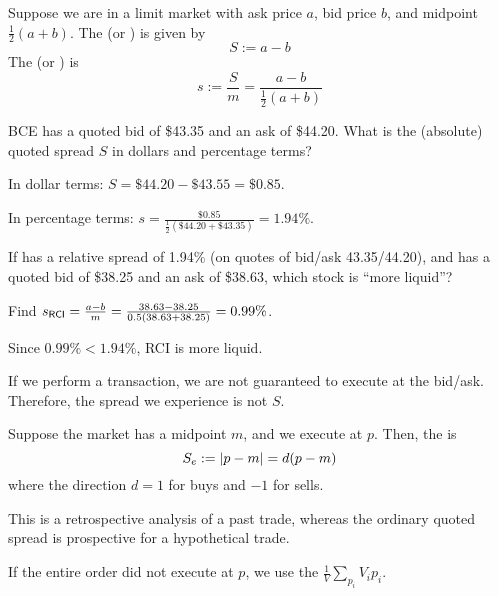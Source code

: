 \documentclass[class=bu430,notes,tikz]{agony}
\begin{document}
\begin{defn}
  Suppose we are in a limit market with ask price $a$, bid price $b$,
  and midpoint $\frac12(a+b)$.
  The  (or ) 
  is given by
  \[ S := a - b \]
  The  (or ) is
  \[ s := \frac{S}{m} = \frac{a-b}{\frac12(a+b)} \]
\end{defn}

\begin{example}
  BCE has a quoted bid of \$43.35 and an ask of \$44.20.
  What is the (absolute) quoted spread $S$ in dollars and percentage terms?
\end{example}
\begin{sol}
  In dollar terms: $S = \$44.20 - \$43.55 = \$0.85$.

    In percentage terms: $s = \frac{\$0.85}{\frac12(\$44.20+\$43.35)} = 1.94\%$.
\end{sol}

\begin{example}
  If  has a relative spread of 1.94\% (on quotes of bid/ask 43.35/44.20),
  and  has a quoted bid of \$38.25 and an ask of \$38.63, which stock is
  ``more liquid''?
\end{example}
\begin{sol}
  Find $s_{\mathsf{RCI}} = \frac{a-b}{m} = \frac{38.63-38.25}{0.5(38.63+38.25)} = 0.99\%$.

  Since $0.99\% < 1.94\%$, RCI is more liquid.
\end{sol}

If we perform a transaction, we are not guaranteed to execute at the bid/ask.
Therefore, the spread we experience is not $S$.

\begin{defn}
  Suppose the market has a midpoint $m$, and we execute at $p$.
  Then, the  is
  \[ S_e := \abs{p - m} = d(p - m) \]
  where the direction $d = 1$ for buys and $-1$ for sells.
\end{defn}

This is a retrospective analysis of a past trade,
whereas the ordinary quoted spread is prospective for a hypothetical trade.

If the entire order did not execute at $p$,
we use the 
$\frac{1}{V}\sum_{p_i} V_i p_i$.
\end{document}
